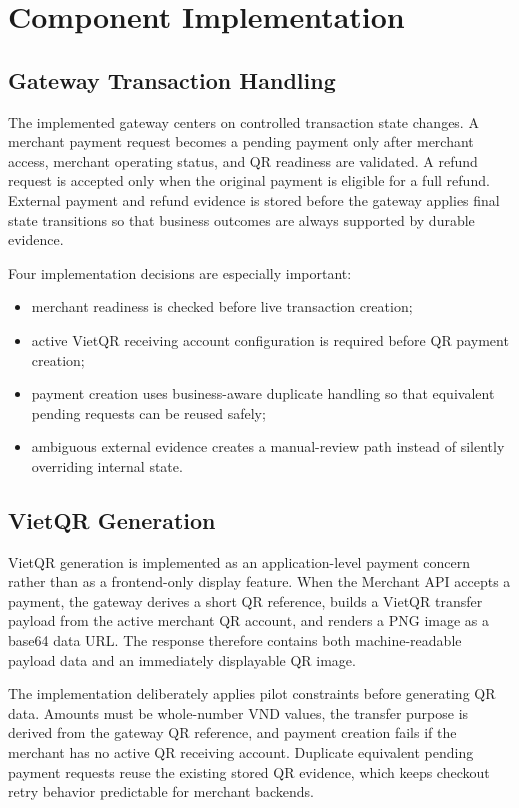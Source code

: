 \chapter{Component Implementation}

\section{Gateway Transaction Handling}

The implemented gateway centers on controlled transaction state changes. A
merchant payment request becomes a pending payment only after merchant access,
merchant operating status, and QR readiness are validated. A refund request is
accepted only when the original payment is
eligible for a full refund. External payment and refund evidence is stored
before the gateway applies final state transitions so that business outcomes are
always supported by durable evidence.

Four implementation decisions are especially important:

\begin{itemize}
  \item merchant readiness is checked before live transaction creation;
  \item active VietQR receiving account configuration is required before QR
  payment creation;
  \item payment creation uses business-aware duplicate handling so that
  equivalent pending requests can be reused safely;
  \item ambiguous external evidence creates a manual-review path instead of
  silently overriding internal state.
\end{itemize}

\section{VietQR Generation}

VietQR generation is implemented as an application-level payment concern rather
than as a frontend-only display feature. When the Merchant API accepts a
payment, the gateway derives a short QR reference, builds a VietQR transfer
payload from the active merchant QR account, and renders a PNG image as a
base64 data URL. The response therefore contains both machine-readable payload
data and an immediately displayable QR image.

The implementation deliberately applies pilot constraints before generating QR
data. Amounts must be whole-number VND values, the transfer purpose is derived
from the gateway QR reference, and payment creation fails if the merchant has no
active QR receiving account. Duplicate equivalent pending payment requests
reuse the existing stored QR evidence, which keeps checkout retry behavior
predictable for merchant backends.

